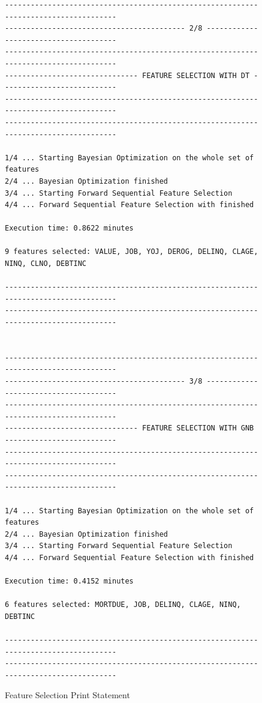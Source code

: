 \begin{figure}[H]
\centering\caption{Feature Selection Print Statement}
\label{fig:featselectprint}

{\fontsize{8.8}{11}\selectfont 
\begin{verbatim}
-------------------------------------------------------------------------------------
------------------------------------------ 2/8 --------------------------------------
-------------------------------------------------------------------------------------
------------------------------- FEATURE SELECTION WITH DT ---------------------------
-------------------------------------------------------------------------------------
------------------------------------------------------------------------------------- 

1/4 ... Starting Bayesian Optimization on the whole set of features
2/4 ... Bayesian Optimization finished
3/4 ... Starting Forward Sequential Feature Selection
4/4 ... Forward Sequential Feature Selection with finished 

Execution time: 0.8622 minutes 

9 features selected: VALUE, JOB, YOJ, DEROG, DELINQ, CLAGE, NINQ, CLNO, DEBTINC 

-------------------------------------------------------------------------------------
------------------------------------------------------------------------------------- 


-------------------------------------------------------------------------------------
------------------------------------------ 3/8 --------------------------------------
-------------------------------------------------------------------------------------
------------------------------- FEATURE SELECTION WITH GNB --------------------------
-------------------------------------------------------------------------------------
------------------------------------------------------------------------------------- 

1/4 ... Starting Bayesian Optimization on the whole set of features
2/4 ... Bayesian Optimization finished
3/4 ... Starting Forward Sequential Feature Selection
4/4 ... Forward Sequential Feature Selection with finished 

Execution time: 0.4152 minutes 

6 features selected: MORTDUE, JOB, DELINQ, CLAGE, NINQ, DEBTINC 

------------------------------------------------------------------------------------- 
------------------------------------------------------------------------------------- 
\end{verbatim}
}
\vspace{0em}
\end{figure}


